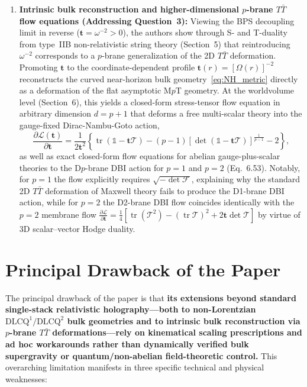 \documentclass[11pt,a4paper]{article}
\newcommand{\lambdap}{\boldsymbol{t}}
\newcommand{\tr}{\operatorname{tr}}
\begin{document}
\begin{enumerate}[label=(\alph*), leftmargin=1.8em]
    \item \textbf{Intrinsic bulk reconstruction and higher-dimensional $p$-brane $T\bar{T}$ flow equations (Addressing Question~3):}
    Viewing the BPS decoupling limit in reverse ($\lambdap = \omega^{-2} > 0$), the authors show through S- and T-duality from type~IIB non-relativistic string theory (Section~5) that reintroducing $\omega^{-2}$ corresponds to a $p$-brane generalization of the 2D $T\bar{T}$ deformation. Promoting $\lambdap$ to the coordinate-dependent profile $\lambdap(r) = [\mathbb{\Omega}(r)]^{-2}$ reconstructs the curved near-horizon bulk geometry~\eqref{eq:NH_metric} directly as a deformation of the flat asymptotic M$p$T geometry. At the worldvolume level (Section~6), this yields a closed-form stress-tensor flow equation in arbitrary dimension $d=p+1$ that deforms a free multi-scalar theory into the gauge-fixed Dirac-Nambu-Goto action,
    \begin{equation}
        \frac{\partial \mathcal{L}(\lambdap)}{\partial \lambdap} = \frac{1}{2\lambdap^2}\left\{\tr(\mathbb{1} - \lambdap\mathcal{T}) - (p-1)\left[\det(\mathbb{1} - \lambdap\mathcal{T})\right]^{\frac{1}{p-1}} - 2\right\},
        \label{eq:scalar_flow}
    \end{equation}
    as well as exact closed-form flow equations for abelian gauge-plus-scalar theories to the D$p$-brane DBI action for $p=1$ and $p=2$ (Eq.~6.53). Notably, for $p=1$ the flow explicitly requires $\sqrt{-\det\mathcal{F}}$, explaining why the standard 2D $T\bar{T}$ deformation of Maxwell theory fails to produce the D1-brane DBI action, while for $p=2$ the D2-brane DBI flow coincides identically with the $p=2$ membrane flow $\frac{\partial\mathcal{L}}{\partial\lambdap} = \frac{1}{4}[\tr(\mathcal{T}^2) - (\tr\mathcal{T})^2 + 2\lambdap\det\mathcal{T}]$ by virtue of 3D scalar--vector Hodge duality.
\end{enumerate}

\section{Principal Drawback of the Paper}

The principal drawback of the paper is that \textbf{its extensions beyond standard single-stack relativistic holography---both to non-Lorentzian $\text{DLCQ}^1/\text{DLCQ}^2$ bulk geometries and to intrinsic bulk reconstruction via $p$-brane $T\bar{T}$ deformations---rely on kinematical scaling prescriptions and ad hoc workarounds rather than dynamically verified bulk supergravity or quantum/non-abelian field-theoretic control.} This overarching limitation manifests in three specific technical and physical weaknesses:
\end{document}
